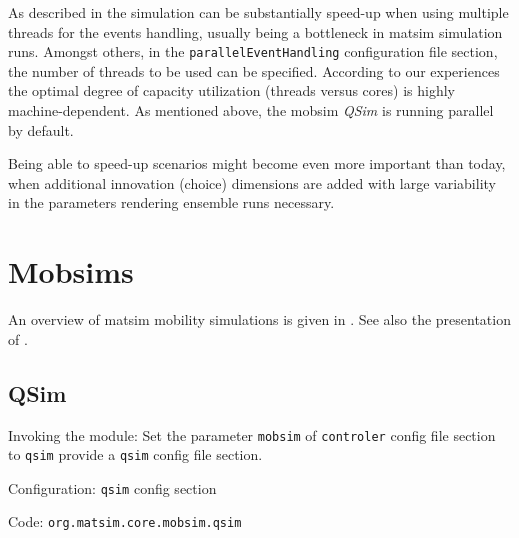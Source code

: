 As described in \citet[][]{WaraichEtAl_TechRep_IVT_2009, WaraichEtAl_STRC_2009} the simulation can be substantially speed-up when using multiple threads for the events handling, usually being a bottleneck in \gls{matsim} simulation runs. Amongst others, in the \lstinline|parallelEventHandling| configuration file section, the number of threads to be used can be specified. 
According to our experiences the optimal degree of capacity utilization (threads versus cores) is highly machine-dependent.
As mentioned above, the mobsim \emph{QSim} is running parallel by default.

Being able to speed-up scenarios might become even more important than today, when additional innovation (choice) dimensions are added with large variability in the parameters rendering ensemble runs necessary. %


\section{Mobsims}
\label{sec:mobsims}
An overview of \gls{matsim} mobility simulations is given in \citet[][]{Dobler_TechRep_IVT_2011}. See also the presentation of \citet[][]{Rieser_unpub_IVT_2011}.

\subsection{QSim}
\label{sec:qsim}
\begin{compactitem}
\item Invoking the module: Set the parameter \lstinline|mobsim| of \lstinline|controler| config file section to \lstinline|qsim| provide a \lstinline|qsim| config file section.
\item Configuration: \lstinline|qsim| config section
\item Code: \lstinline|org.matsim.core.mobsim.qsim|
\end{compactitem}

